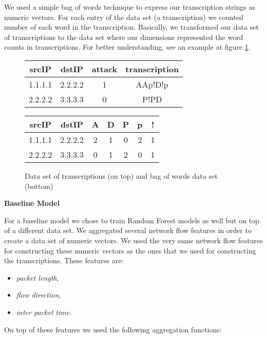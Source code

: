 \documentclass{article}
\begin{document}
We used a simple bag of words technique to express our transcription strings as numeric vectors. For each entry of the data set (a transcription) we counted number of each word in the transcription. Basically, we transformed our data set of transcriptions to the data set where our dimensions represented the word counts in transcriptions. For better understanding, see an example at figure \ref{fig-bag-of-words-example}.

\begin{figure}[h!]
\centering
\begin{tabular}{ |c|c|c|c| }
 \hline
 srcIP & dstIP & attack & transcription \\
 \hline
 1.1.1.1 & 2.2.2.2 & 1 & AAp!D!p \\
 2.2.2.2 & 3.3.3.3 & 0 & P!PD \\
 \hline
\end{tabular}

\vspace{0.3cm}

\begin{tabular}{ |c|c|c|c|c|c|c| }
 \hline
 srcIP & dstIP & A & D & P & p & ! \\
 \hline
 1.1.1.1 & 2.2.2.2 & 2 & 1 & 0 & 2 & 1 \\
 2.2.2.2 & 3.3.3.3 & 0 & 1 & 2 & 0 & 1 \\
 \hline
\end{tabular}
\caption{Data set of transcriptions (on top) and bag of words data set (bottom)}
\label{fig-bag-of-words-example}
\end{figure}


\noindent\textbf{Baseline Model}

For a baseline model we chose to train Random Forest models as well but on top of a different data set. We aggregated several network flow features in order to create a data set of numeric vectors. We used the very same network flow features for constructing these numeric vectors as the ones that we used for constructing the transcriptions. These features are:

\begin{itemize}
    \item \textit{packet length},
    \item \textit{flow direction},
    \item \textit{inter packet time}.
\end{itemize}

\noindent On top of these features we used the following aggregation functions:
\end{document}
